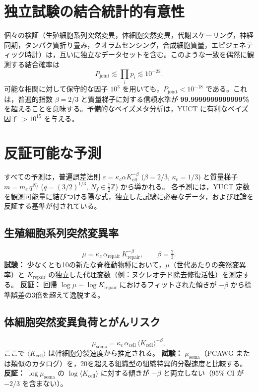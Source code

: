 \documentclass[11pt,a4paper]{article}
\begin{document}
	\section{独立試験の結合統計的有意性}
	
	個々の検証（生殖細胞系列突然変異，体細胞突然変異，代謝スケーリング，神経同期，タンパク質折り畳み，クオラムセンシング，合成細胞質量，エピジェネティック時計）は，互いに独立なデータセットを含む。このような一致を偶然に観測する結合確率は
	\[
	P_{\text{joint}} \lesssim \prod_i p_i \lesssim 10^{-22}.
	\]
	可能な相関に対して保守的な因子 \(10^3\) を用いても，\(P_{\text{joint}} < 10^{-18}\) である。これは，普遍的指数 \(\beta=2/3\) と質量梯子に対する信頼水準が \textbf{99.9999999999999\%} を超えることを意味する。予備的なベイズメタ分析は，YUCT に有利なベイズ因子 \(>10^{15}\) を与える。
	
	\section{反証可能な予測}
	
	すべての予測は，普遍誤差法則
	\(\varepsilon = \kappa_c \alpha K_{\mathrm{eff}}^{-\beta}\)
	(\(\beta=2/3\), \(\kappa_c=1/3\)) と質量梯子
	\(m = m_e\,q^{N_f}\) (\(q=(3/2)^{1/3}\), \(N_f\in\tfrac12\mathbb{Z}\)) から導かれる。
	各予測には，YUCT 定数を観測可能量に結びつける陽な式，独立した試験に必要なデータ，および理論を反証する基準が付されている。
	
	\subsection{生殖細胞系列突然変異率}
	
	\begin{equation}\label{eq:pred-mutation}
		\mu = \kappa_c\,\alpha_{\mathrm{repair}}\,
		K_{\mathrm{repair}}^{-\beta}, \qquad \beta = \tfrac23 .
	\end{equation}
	\textbf{試験：} 少なくとも10の新たな脊椎動物種において，\(\mu\)（世代あたりの突然変異率）と \(K_{\mathrm{repair}}\) の独立した代理変数（例：ヌクレオチド除去修復活性）を測定する。
	\textbf{反証：} 回帰 \(\log\mu \sim \log K_{\mathrm{repair}}\) におけるフィットされた傾きが \(-\beta\) から標準誤差の3倍を超えて逸脱する。
	
	\subsection{体細胞突然変異負荷とがんリスク}
	
	\begin{equation}\label{eq:pred-somatic}
		\mu_{\mathrm{soma}} = \kappa_c\,\alpha_{\mathrm{cell}}\,
		\langle K_{\mathrm{cell}}\rangle^{-\beta},
	\end{equation}
	ここで \(\langle K_{\mathrm{cell}}\rangle\) は幹細胞分裂速度から推定される。
	\textbf{試験：} \(\mu_{\mathrm{soma}}\)（PCAWG または類似のカタログ）を，20を超える組織型の組織特異的分裂速度と比較する。
	\textbf{反証：} \(\log\mu_{\mathrm{soma}}\) の \(\log\langle K_{\mathrm{cell}}\rangle\) に対する傾きが \(-\beta\) と両立しない（95\% CI が \(-2/3\) を含まない）。
	
\end{document}
